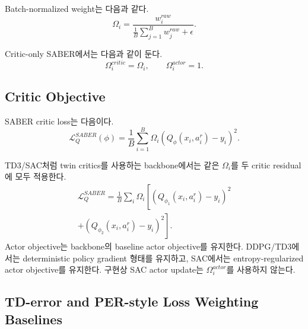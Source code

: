 \documentclass[letterpaper]{article}
\begin{document}
Batch-normalized weight는 다음과 같다.
\begin{equation}
\Omega_i =
\frac{w_i^{raw}}
{\frac{1}{B}\sum_{j=1}^{B} w_j^{raw} + \epsilon}.
\end{equation}

Critic-only SABER에서는 다음과 같이 둔다.
\begin{equation}
\Omega_i^{critic} = \Omega_i,
\qquad
\Omega_i^{actor} = 1.
\end{equation}

\subsection{Critic Objective}

SABER critic loss는 다음이다.
\begin{equation}
\mathcal L_Q^{SABER}(\phi)
=
\frac{1}{B}\sum_{i=1}^{B}
\Omega_i
\left(Q_\phi(x_i,a_i^r)-y_i\right)^2.
\end{equation}

TD3/SAC처럼 twin critics를 사용하는 backbone에서는 같은 \(\Omega_i\)를 두 critic residual에 모두 적용한다.
\begin{equation}
\begin{aligned}
\mathcal L_Q^{SABER}
=
\frac{1}{B}\sum_i \Omega_i
\left[
\left(Q_{\phi_1}(x_i,a_i^r)-y_i\right)^2
\right.\\
\left.
+\left(Q_{\phi_2}(x_i,a_i^r)-y_i\right)^2
\right].
\end{aligned}
\end{equation}
Actor objective는 backbone의 baseline actor objective를 유지한다. DDPG/TD3에서는 deterministic policy gradient 형태를 유지하고, SAC에서는 entropy-regularized actor objective를 유지한다. 구현상 SAC actor update는 \(\Omega_i^{actor}\)를 사용하지 않는다.

\subsection{TD-error and PER-style Loss Weighting Baselines}
\end{document}

